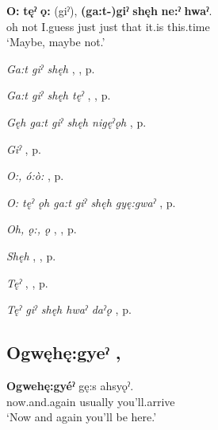 \ea
\label{ex:opart5}
\gll \textbf{O:} \textbf{tęˀ} \textbf{ǫ:} (giˀ), \textbf{(ga:t-)giˀ} \textbf{shęh} \textbf{ne:ˀ} \textbf{hwaˀ}.\\
oh not I.guess just just that it.is this.time\\
\glt ‘Maybe, maybe not.’
\z

\begin{CayugaRelated}
\item \textit{Ga:t giˀ shęh} , , p. \pageref{p:[ga:t giˀ shęh]}\\
\item \textit{Ga:t giˀ shęh tęˀ} , , p. \pageref{p:[ga:t giˀ shęh tęˀ]}\\
\item \textit{Gęh ga:t giˀ shęh nigęˀǫh} , p. \pageref{p:[gęh ga:t giˀ shęh nigęˀǫh]}\\
\item \textit{Giˀ} , p. \pageref{p:[giˀ]}\\
\item \textit{O:, ó:ò:} , p. \pageref{p:[o:, ó:ò:]}\\
\item \textit{O: tęˀ ǫh ga:t giˀ shęh gyę:gwaˀ} , p. \pageref{p:[o: tęˀ ǫh ga:t giˀ shęh gyę:gwaˀ]}\\
\item \textit{Oh, ǫ:, ǫ} , , p. \pageref{p:[ǫh, ǫ:, ǫ]}\\
\item \textit{Shęh} , , p. \pageref{p:[shęh] `because’}\\
\item \textit{Tęˀ} , , p. \pageref{p:[tęˀ]}\\
\item \textit{Tęˀ giˀ shęh hwaˀ daˀǫ} , p. \pageref{p:[tęˀ giˀ shęh hwaˀ daˀǫ]}
\end{CayugaRelated}




\subsection*{\textbf{Ogwęhę:gyeˀ} , } \label{p:[ogwęhę:gyeˀ]}

\ea
\label{ex:opart6}
\gll \textbf{Ogwehę:gyéˀ} gę:s ahsyǫˀ.\\
now.and.again usually you’ll.arrive\\
\glt ‘Now and again you’ll be here.’
\z

